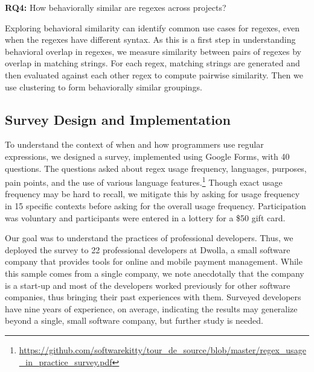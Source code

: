\noindent \textbf{RQ4:} How behaviorally similar are regexes across projects?

Exploring behavioral similarity can identify common use cases for regexes, even when the regexes have different syntax.
As this is a first step in understanding behavioral overlap in
regexes, we measure similarity between pairs of regexes by overlap in matching strings. For each regex, matching strings are generated and then  evaluated against each other regex to compute pairwise similarity. Then we use clustering to form behaviorally similar groupings.

\subsection{Survey Design and Implementation}
\label{study:survey}
To understand the context of when and how programmers use regular expressions,
we designed a survey, implemented using Google Forms, with 40 questions. The questions asked about regex usage frequency, languages, purposes, pain points, and the use of various language
features.\footnote{\url{https://github.com/softwarekitty/tour_de_source/blob/master/regex_usage_in_practice_survey.pdf}}  Though exact usage frequency may be hard to recall, we mitigate this by asking for usage frequency in 15 specific contexts before asking for the overall usage frequency.
Participation was voluntary and participants were entered in a lottery for a \$50 gift card.

Our goal was to understand the practices of professional developers. Thus, we deployed the survey to 22 professional developers at Dwolla, a small software company that provides tools for online and mobile payment management. While this sample comes from a single company, we note anecdotally that the company is a start-up and most of the developers worked previously for other software companies, thus bringing their past experiences with them. Surveyed developers have nine years of experience, on average, indicating the results may generalize beyond a single, small software company, but further study is needed.

